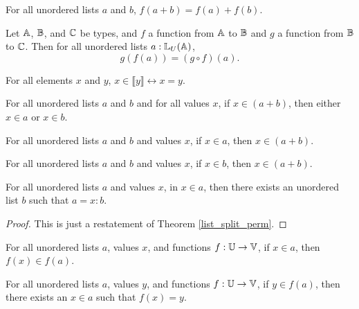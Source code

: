 \documentclass[../math.tex]{subfiles}
\begin{document}
\begin{theorem}
    For all unordered lists $a$ and $b$, $f(a + b) = f(a) + f(b)$.
\end{theorem}

\begin{theorem}
    Let $\mathbb{A}$, $\mathbb{B}$, and $\mathbb{C}$ be types, and $f$ a function from $\mathbb{A}$ to $\mathbb{B}$ and
    $g$ a function from $\mathbb{B}$ to $\mathbb{C}$.  Then for all unordered lists $a :
    \mathbb{L}_U(\mathbb{A})$,
    \[
        g(f(a)) = (g \circ f)(a).
    \]
\end{theorem}

\begin{theorem}
    For all elements $x$ and $y$, $x \in \llbracket y\rrbracket \leftrightarrow
    x = y$.
\end{theorem}

\begin{theorem} \label{in_ulist_conc}
    For all unordered lists $a$ and $b$ and for all values $x$, if $x \in (a +
    b)$, then either $x \in a$ or $x \in b$.
\end{theorem}

\begin{theorem} \label{in_ulist_lconc}
    For all unordered lists $a$ and $b$ and values $x$, if $x \in a$, then $x
    \in (a + b)$.
\end{theorem}

\begin{theorem} \label{in_ulist_rconc}
    For all unordered lists $a$ and $b$ and values $x$, if $x \in b$, then $x
    \in (a + b)$.
\end{theorem}

\begin{theorem} \label{in_ulist_split}
    For all unordered lists $a$ and values $x$, in $x \in a$, then there exists
    an unordered list $b$ such that $a = x : b$.
\end{theorem}
\begin{proof}
    This is just a restatement of Theorem \ref{list_split_perm}.
\end{proof}

\begin{theorem} \label{in_ulist_image}
    For all unordered lists $a$, values $x$, and functions $f : \mathbb{U} \to \mathbb{V}$, if
    $x \in a$, then $f(x) \in f(a)$.
\end{theorem}

\begin{theorem} \label{image_in_ulist}
    For all unordered lists $a$, values $y$, and functions $f : \mathbb{U} \to \mathbb{V}$, if
    $y \in f(a)$, then there exists an $x \in a$ such that $f(x) = y$.
\end{theorem}
\end{document}
